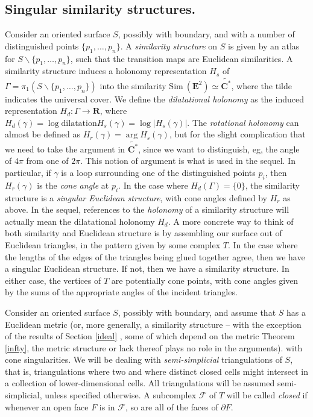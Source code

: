 \documentclass{acmart}
\newcommand{\Sim}{\mathrm{Sim\:}}
\begin{document}
\subsection{Singular similarity structures.} 
Consider an oriented surface $S$, possibly with boundary, and with a
number of distinguished points $\{p_1, \ldots, p_n\}$. A
\emph{similarity structure} on $S$ is given by an atlas for $S
\backslash \{p_1, \ldots, p_n\}$, such that the transition maps are
Euclidean similarities. A similarity structure induces a
holonomy representation $H_s$ of $\Gamma = \pi_1(S \backslash \{p_1, \ldots,
p_n\})$ into the similarity $\Sim (\mathbf{E}^2)\simeq
\widetilde{\mathbf{C}^*}$, where the tilde indicates the universal
cover. We define the  
\emph{dilatational   holonomy} as the induced representation $H_d:
\Gamma \rightarrow \mathbf{R}$, where
$H_d(\gamma) = \log \mbox{dilatation} H_s(\gamma) = \log |H_s(\gamma)|$. The
\emph{rotational holonomy} can almost be defined as $H_r(\gamma) = \arg
H_s(\gamma)$, but for the slight complication that we need to take the
argument in $\widetilde{\mathbf{C}^*}$, since we want to distinguish, eg, the
angle of $4\pi$ from one of $2\pi.$ This notion of argument is what is
used in the sequel. In particular, if $\gamma$ is a
loop surrounding one of the distinguished points $p_i$, then 
$H_r(\gamma)$ is the \emph{cone angle} at $p_i$. In the case where
$H_d(\Gamma) = \{0\}$, the similarity  structure is a \emph{singular
  Euclidean structure}, with cone angles defined by $H_r$ as above. In
the sequel, references to the \emph{holonomy} of a similarity
structure will actually mean the dilatational holonomy $H_d$. A
more concrete way to think of both similarity and Euclidean structure
is by assembling our surface out of Euclidean triangles, in the
pattern given by some complex $T$. In the case
where the lengths of the edges of the triangles being glued together
agree, then we have a singular Euclidean structure. If not, then we
have a similarity structure. In either case, the vertices of $T$ are
potentially cone points, with cone angles given by the sums of the
appropriate angles of the incident triangles.

Consider an oriented surface $S$, possibly with boundary, and assume 
that $S$ has a Euclidean metric (or, more generally, a similarity
structure -- with the exception of the results of Section \ref{ideal} ,
some of which depend on the metric Theorem \ref{infty}, the metric
structure or lack thereof plays no role in the arguments).
with cone singularities. We will be
dealing with \emph{semi-simplicial} triangulations of $S$, that is,
triangulations where two and where distinct closed cells might
intersect in a 
collection of lower-dimensional cells. All triangulations will be
assumed semi-simplicial, unless specified otherwise.  A subcomplex
$\mathcal{F}$ of $T$ will be called \emph{closed} if whenever an open
face $F$ is in $\mathcal{F}$, so are all of the faces of $\partial
F$. 
\end{document}
